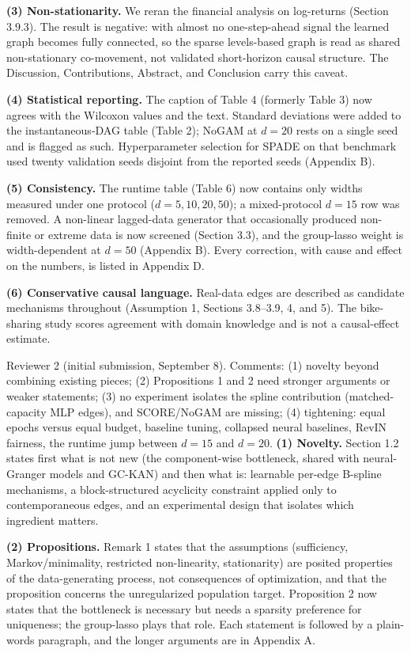 \textbf{(3) Non-stationarity.} We reran the financial analysis on log-returns (Section 3.9.3). The result is negative: with almost no one-step-ahead signal the learned graph becomes fully connected, so the sparse levels-based graph is read as shared non-stationary co-movement, not validated short-horizon causal structure. The Discussion, Contributions, Abstract, and Conclusion carry this caveat.

\textbf{(4) Statistical reporting.} The caption of Table 4 (formerly Table 3) now agrees with the Wilcoxon values and the text. Standard deviations were added to the instantaneous-DAG table (Table 2); NoGAM at $d=20$ rests on a single seed and is flagged as such. Hyperparameter selection for SPADE on that benchmark used twenty validation seeds disjoint from the reported seeds (Appendix B).

\textbf{(5) Consistency.} The runtime table (Table 6) now contains only widths measured under one protocol ($d = 5, 10, 20, 50$); a mixed-protocol $d = 15$ row was removed. A non-linear lagged-data generator that occasionally produced non-finite or extreme data is now screened (Section 3.3), and the group-lasso weight is width-dependent at $d = 50$ (Appendix B). Every correction, with cause and effect on the numbers, is listed in Appendix D.

\textbf{(6) Conservative causal language.} Real-data edges are described as candidate mechanisms throughout (Assumption 1, Sections 3.8--3.9, 4, and 5). The bike-sharing study scores agreement with domain knowledge and is not a causal-effect estimate.
\item[R2] Reviewer 2 (initial submission, September 8). Comments: (1) novelty beyond combining existing pieces; (2) Propositions 1 and 2 need stronger arguments or weaker statements; (3) no experiment isolates the spline contribution (matched-capacity MLP edges), and SCORE/NoGAM are missing; (4) tightening: equal epochs versus equal budget, baseline tuning, collapsed neural baselines, RevIN fairness, the runtime jump between $d=15$ and $d=20$.
\textbf{(1) Novelty.} Section 1.2 states first what is not new (the component-wise bottleneck, shared with neural-Granger models and GC-KAN) and then what is: learnable per-edge B-spline mechanisms, a block-structured acyclicity constraint applied only to contemporaneous edges, and an experimental design that isolates which ingredient matters.

\textbf{(2) Propositions.} Remark 1 states that the assumptions (sufficiency, Markov/minimality, restricted non-linearity, stationarity) are posited properties of the data-generating process, not consequences of optimization, and that the proposition concerns the unregularized population target. Proposition 2 now states that the bottleneck is necessary but needs a sparsity preference for uniqueness; the group-lasso plays that role. Each statement is followed by a plain-words paragraph, and the longer arguments are in Appendix A.

